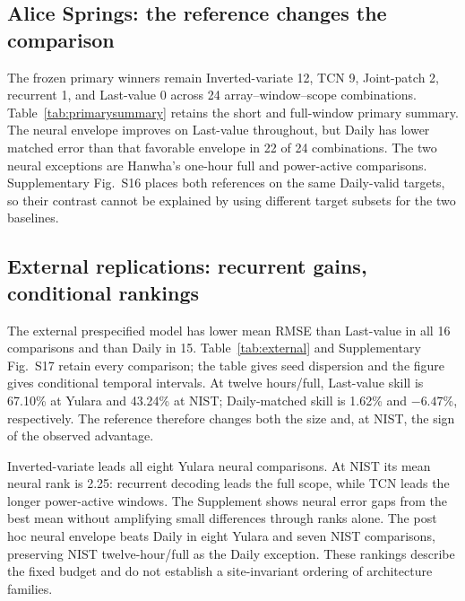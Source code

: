 \documentclass[aip,reprint,floatfix,amsmath,amssymb]{revtex4-2}
\begin{document}
\subsection{Alice Springs: the reference changes the comparison}
The frozen primary winners remain Inverted-variate 12, TCN 9, Joint-patch 2, recurrent 1, and Last-value 0 across 24 array--window--scope combinations. Table~\ref{tab:primarysummary} retains the short and full-window primary summary. The neural envelope improves on Last-value throughout, but Daily has lower matched error than that favorable envelope in 22 of 24 combinations. The two neural exceptions are Hanwha's one-hour full and power-active comparisons. Supplementary Fig.~S16 places both references on the same Daily-valid targets, so their contrast cannot be explained by using different target subsets for the two baselines.





\subsection{External replications: recurrent gains, conditional rankings}
The external prespecified model has lower mean RMSE than Last-value in all 16 comparisons and than Daily in 15. Table~\ref{tab:external} and Supplementary Fig.~S17 retain every comparison; the table gives seed dispersion and the figure gives conditional temporal intervals. At twelve hours/full, Last-value skill is 67.10\% at Yulara and 43.24\% at NIST; Daily-matched skill is 1.62\% and $-6.47$\%, respectively. The reference therefore changes both the size and, at NIST, the sign of the observed advantage.





Inverted-variate leads all eight Yulara neural comparisons. At NIST its mean neural rank is 2.25: recurrent decoding leads the full scope, while TCN leads the longer power-active windows. The Supplement shows neural error gaps from the best mean without amplifying small differences through ranks alone. The post hoc neural envelope beats Daily in eight Yulara and seven NIST comparisons, preserving NIST twelve-hour/full as the Daily exception. These rankings describe the fixed budget and do not establish a site-invariant ordering of architecture families.
\end{document}
